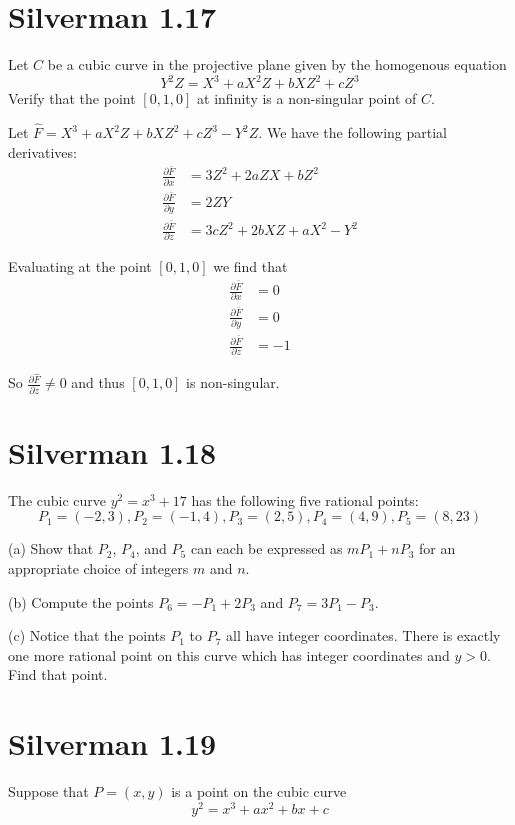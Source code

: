 \documentclass{article}
\begin{document}
\section{Silverman 1.17}
Let $C$ be a cubic curve in the projective plane given by the homogenous equation 
$$Y^2 Z = X^3 + aX^2 Z + bXZ^2 + cZ^3$$
Verify that the point $[0,1,0]$ at infinity is a non-singular point of $C$.

Let $\hat F = X^3 + aX^2 Z + bXZ^2 + cZ^3 - Y^2Z$. We have the following partial derivatives:
\begin{align*}
\frac{\partial \bar F}{\partial x} &= 3Z^2 + 2aZX + bZ^2 \\
\frac{\partial \bar F}{\partial y} &= 2ZY \\
\frac{\partial \bar F}{\partial z} &= 3cZ^2 + 2bXZ + aX^2 - Y^2
\end{align*}

Evaluating at the point $[0,1,0]$ we find that
\begin{align*}
\frac{\partial \bar F}{\partial x} &= 0 \\
\frac{\partial \bar F}{\partial y} &= 0 \\
\frac{\partial \bar F}{\partial z} &= -1
\end{align*}

So $\frac{\partial \hat F}{\partial z} \neq 0$ and thus $[0,1,0]$ is non-singular.

\section{Silverman 1.18}
The cubic curve $y^2 = x^3 + 17$ has the following five rational points:
$$P_1 = (-2,3), P_2 = (-1,4), P_3 = (2,5), P_4 = (4,9), P_5 = (8,23)$$

(a) Show that $P_2$, $P_4$, and $P_5$ can each be expressed as $mP_1 + nP_3$ for an appropriate choice of integers $m$ and $n$.

(b) Compute the points $P_6 = -P_1 + 2P_3$ and $P_7 = 3P_1 - P_3$.

(c) Notice that the points $P_1$ to $P_7$ all have integer coordinates. There is exactly one more rational point on this curve which has integer coordinates and $y > 0$. Find that point.

\section{Silverman 1.19}
Suppose that $P = (x,y)$ is a point on the cubic curve
$$y^2 = x^3 + ax^2 + bx + c$$
\end{document}
